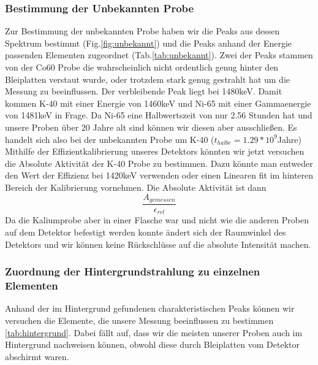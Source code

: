 \documentclass[]{article}
\begin{document}
	\subsubsection{Bestimmung der Unbekannten Probe}
	Zur Bestimmung der unbekannten Probe haben wir die Peaks aus dessen Spektrum bestimmt (Fig.\ref{fig:unbekannt}) und die Peaks anhand der Energie passenden Elementen zugeordnet (Tab.\ref{tab:unbekannt}). Zwei der Peaks stammen von der Co60 Probe die wahrscheinlich nicht ordentlich genug hinter den Bleiplatten verstaut wurde, oder trotzdem stark genug gestrahlt hat um die Messung zu beeinflussen. Der verbleibende Peak liegt bei 1480keV. Damit kommen K-40 mit einer Energie von 1460keV und Ni-65 mit einer Gammaenergie von 1481keV in Frage. Da Ni-65 eine Halbwertszeit von nur 2.56 Stunden hat und unsere Proben über 20 Jahre alt sind können wir diesen aber ausschließen. Es handelt sich also bei der unbekannten Probe um K-40 ($t_{halbe}=1.29*10^9$Jahre)
	Mithilfe der Effizientkalibrierung unseres Detektors könnten wir jetzt versuchen die Absolute Aktivität der K-40 Probe zu bestimmen. Dazu könnte man entweder den Wert der Effizienz bei 1420keV verwenden oder einen Linearen fit im hinteren Bereich der Kalibrierung vornehmen.
	Die Absolute Aktivität ist dann
	\begin{equation}
		\frac{A_{gemessen}}{\epsilon_{rel}}
	\end{equation}
	Da die Kaliumprobe aber in einer Flasche war und nicht wie die anderen Proben auf dem Detektor befestigt werden konnte ändert sich der Raumwinkel des Detektors und wir können keine Rückschlüsse auf die absolute Intensität machen.
	\subsubsection{Zuordnung der Hintergrundstrahlung zu einzelnen Elementen}
	Anhand der im Hintergrund gefundenen charakteristischen Peaks können wir versuchen die Elemente, die unsere Messung beeinflussen zu bestimmen \ref{tab:hintergrund}. Dabei fällt auf, dass wir die meisten unserer Proben auch im Hintergrund nachweisen können, obwohl diese durch Bleiplatten vom Detektor abschirmt waren.
	
\end{document}
